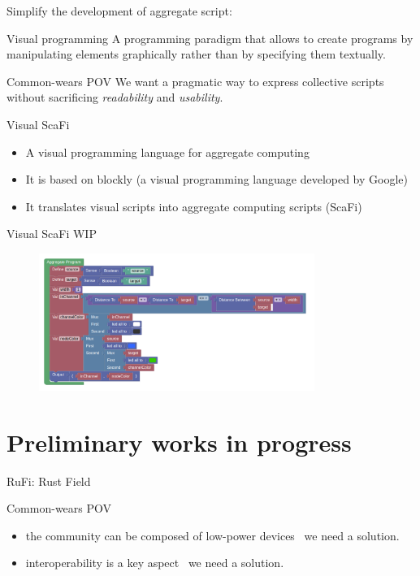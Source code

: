 \documentclass[presentation, 9pt, aspectratio=169]{beamer}\mode<presentation>{\usetheme{AMSBolognaFC}}
\begin{document}
\begin{frame}{Simplify the development of aggregate script: }
	\begin{alertblock}{Visual programming}
		A programming paradigm that allows to create programs by manipulating elements graphically rather than by specifying them textually.		
	\end{alertblock}
	\begin{exampleblock}{Common-wears POV}
		We want a pragmatic way to express collective scripts without sacrificing \emph{readability} and \emph{usability}.
	\end{exampleblock}
	\begin{exampleblock}{Visual ScaFi}
		\begin{itemize}
			\item A visual programming language for aggregate computing
			\item It is based on blockly (a visual programming language developed by Google)
			\item It translates visual scripts into aggregate computing scripts (ScaFi)		
		\end{itemize}
	\end{exampleblock}
\end{frame}
\begin{frame}{Visual ScaFi WIP}
\begin{figure}
	\centering
	\includegraphics[width=0.8\textwidth]{img/example}
\end{figure}
\end{frame}
\section{Preliminary works in progress}
\begin{frame}{RuFi: Rust Field}
\begin{alertblock}{Common-wears POV}
	\begin{itemize}
		\item the community can be composed of low-power devices \faArrowRight \, we need a  solution.
		\item interoperability is a key aspect \faArrowRight \, we need a  solution.
	\end{itemize}
\end{alertblock}
\end{frame}
\end{document}
